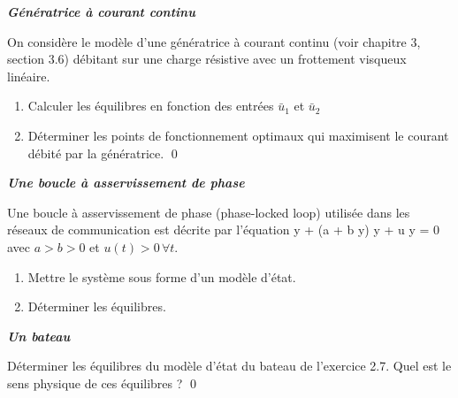 \begin{exercice}{\bf \em G\'en\'eratrice \`a courant continu}

On consid\`ere le mod\`ele d'une g\'en\'eratrice \`a courant continu (voir chapitre 3, section 3.6) d\'ebitant sur une charge r\'esistive avec un frottement visqueux lin\'eaire.
\begin{enumerate}
\item Calculer les \'equilibres en fonction des entr\'ees $\bar u_1$ et $\bar u_2$
\item D\'eterminer les points de fonctionnement optimaux qui maximisent le courant d\'ebit\'e par la g\'en\'eratrice. \qed
\end{enumerate}
\end{exercice}
\vv

\begin{exercice}{\bf \em Une boucle à asservissement de phase}

Une boucle à asservissement de phase (phase-locked loop) utilisée dans les réseaux  de communication est décrite par l'équation
\eqnn
\ddot y + (a + b \cos y) \dot y + u \sin y = 0
\eeqnn
avec $a > b > 0$ et $u(t) > 0 \, \forall t$. 
\begin{enumerate}
\item Mettre le système sous forme d'un modèle d'état.
\item Déterminer les équilibres.
\end{enumerate}
\end{exercice}
\vv

\begin{exercice}{\bf \em Un bateau}

Déterminer les équilibres du modèle d'état du bateau de l'exercice 2.7. Quel est le sens physique de ces équilibres ? \qed
\end{exercice}
\vv 

